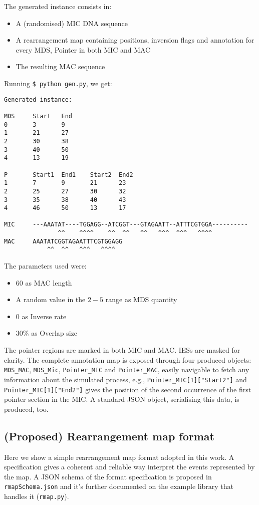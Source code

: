 The generated instance consists in:

\begin{itemize}
	\item A (randomised) MIC DNA sequence
	\item A rearrangement map containing positions, inversion flags and annotation for every MDS, Pointer in both MIC and MAC
	\item The resulting MAC sequence
\end{itemize}

Running \texttt{\$ python gen.py}, we get:
\begin{verbatim}
Generated instance:

MDS     Start   End
0       3       9
1       21      27
2       30      38
3       40      50
4       13      19

P       Start1  End1    Start2  End2
1       7       9       21      23
2       25      27      30      32
3       35      38      40      43
4       46      50      13      17

MIC     ---AAATAT----TGGAGG--ATCGGT---GTAGAATT--ATTTCGTGGA----------
               ^^    ^^^^    ^^  ^^   ^^   ^^^  ^^^   ^^^^
MAC     AAATATCGGTAGAATTTCGTGGAGG
            ^^  ^^   ^^^   ^^^^
\end{verbatim}
The parameters used were:

\begin{itemize}
	\item $60$ as MAC length
	\item A random value in the $2-5$ range as MDS quantity
	\item $0$ as Inverse rate
	\item $30\%$ as Overlap size
\end{itemize}

The pointer regions are marked in both MIC and MAC. IESs are masked for clarity. The complete annotation map is exposed through four produced objects: \texttt{MDS\_MAC}, \texttt{MDS\_Mic}, \texttt{Pointer\_MIC} and \texttt{Pointer\_MAC}, easily navigable to fetch any information about the simulated process, e.g., \texttt{Pointer\_MIC[1]["Start2"]} and \texttt{Pointer\_MIC[1]["End2"]} gives the position of the second occurrence of the first pointer section in the MIC. A standard JSON object, serialising this data, is produced, too.

\subsection{(Proposed) Rearrangement map format}
\label{rmap}
Here we show a simple rearrangement map format adopted in this work. A specification gives a coherent and reliable way interpret the events represented by the map.
A JSON schema of the format specification is proposed in \texttt{rmapSchema.json} and it's further documented on the example library that handles it (\texttt{rmap.py}).

